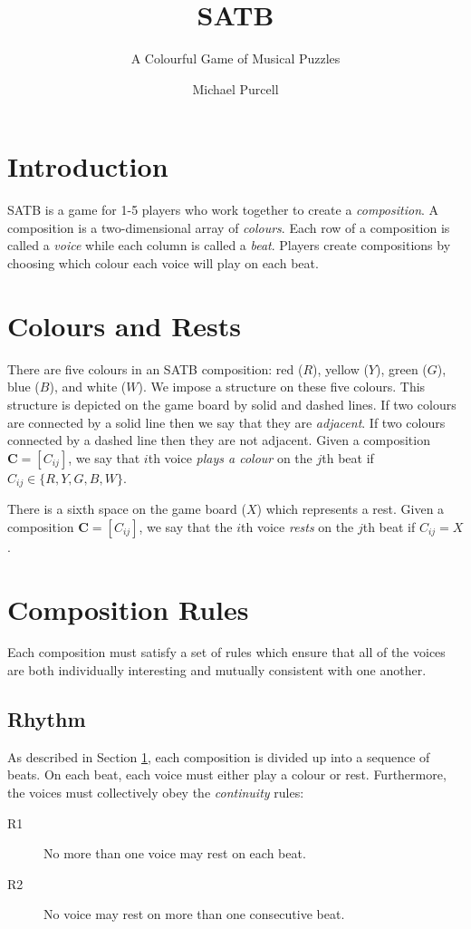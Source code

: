 \documentclass{scrartcl}
\title{SATB}
\subtitle{A Colourful Game of Musical Puzzles}
\author{Michael Purcell}
\date{}
\begin{document}
\maketitle
\section{Introduction}\label{section:introduction}
SATB is a game for 1-5 players who work together to create a \emph{composition}.
A composition is a two-dimensional array of \emph{colours}.   
Each row of a composition is called a \emph{voice} while
each column is called a \emph{beat}.
Players create compositions by choosing which colour each voice will play on
each beat. 

\section{Colours and Rests}
There are five colours in an SATB composition:
red ($R$), yellow ($Y$), green ($G$), blue ($B$), and white ($W$).
We impose a structure on these five colours. This structure is depicted on the game
board by solid and dashed lines. 
If two colours are connected by a solid line then we say that they are \emph{adjacent}.
If two colours connected by a dashed line then they are not adjacent.
Given a composition $\mathbf{C} = [C_{ij}]$, we say that $i$th voice
\emph{plays a colour} on the $j$th beat if $C_{ij} \in \{R, Y, G, B, W\}$.

There is a sixth space on the game board ($X$) which represents a rest.
Given a composition $\mathbf{C} = [C_{ij}]$,
we say that the $i$th voice \emph{rests} on the $j$th beat if $C_{ij} = X$.

\section{Composition Rules}
Each composition must satisfy a set of rules which ensure that all of the voices are
both individually interesting and mutually consistent with one another.
 
\subsection{Rhythm}
As described in Section \ref{section:introduction}, each composition is divided up into a sequence of beats. On each beat, each voice must either play a colour or rest.
Furthermore, the voices must collectively obey the \emph{continuity} rules:
\begin{description}
	\item[R1] No more than one voice may rest on each beat.
	\item[R2] No voice may rest on more than one consecutive beat.
\end{description}
\end{document}
